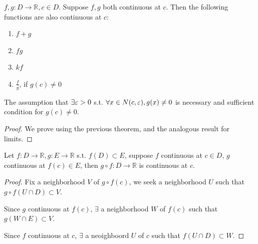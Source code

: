 \begin{theorem}
    $f, g: D \to \mathbb{R}, c \in D$. Suppose $f, g$ both
    continuous at $c$. Then the following functions are also
    continuous at $c$:
    \begin{enumerate}
        \item $f + g$
        \item $fg$
        \item $kf$
        \item $ \frac{f}{g}$, if $g(c) \neq 0$
    \end{enumerate} 
\end{theorem}

\begin{remark}
    The assumption that $\exists \varepsilon > 0$
    s.t. 
    $\forall x \in N(c, \varepsilon), g(x) \neq 0$
    is necessary and sufficient condition for $g(c) \neq 0$.
\end{remark}

\begin{proof}
    We prove using the previous theorem, and the 
    analogous result for limits.
\end{proof}


\begin{theorem}
    Let $f: D \to \mathbb{R}, g: E \to \mathbb{R}$ s.t.
    $f(D) \subset E$, 
    suppose $f$ continuous at $c \in D$, $g$ continuous at $f(c) \in E$, 
    then $g \circ f : D \to \mathbb{R}$ is continuous at $c$.
\end{theorem}

\begin{proof}
    Fix a neighborhood $V$ of $g \circ f(c)$, we seek a neighborhood $U$
    such that $g \circ f( U \cap D) \subset V$. 
    \medskip

    Since $g$ continuous at $f(c)$, $\exists $ a neighborhood $W$
    of $f(c)$ such that $g(W \cap E) \subset V$. 
    \medskip

    Since $f$ continuous at $c$, $\exists$ a neoighboord $U$ of $c$ such that 
    $f(U \cap D) \subset W$.
\end{proof}


